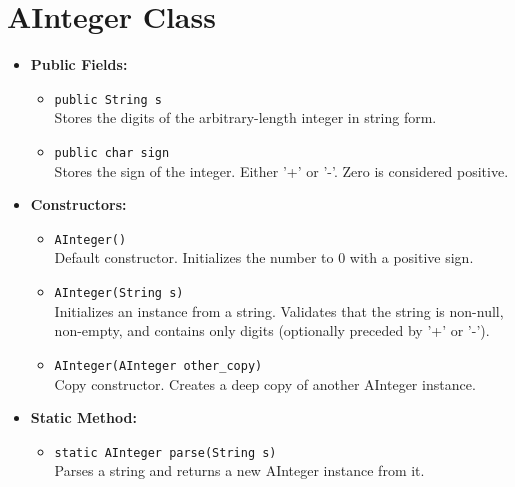 \documentclass{article}
\begin{document}
\section{AInteger Class}
\begin{itemize}
    \item \textbf{Public Fields:}
    \begin{itemize}
        \item \texttt{public String s} \\
        Stores the digits of the arbitrary-length integer in string form.

        \item \texttt{public char sign} \\
        Stores the sign of the integer. Either '+' or '-'. Zero is considered positive.
    \end{itemize}

    \item \textbf{Constructors:}
    \begin{itemize}
        \item \texttt{AInteger()} \\
        Default constructor. Initializes the number to 0 with a positive sign.

        \item \texttt{AInteger(String s)} \\
        Initializes an instance from a string. Validates that the string is non-null, non-empty, and contains only digits (optionally preceded by '+' or '-').

        \item \texttt{AInteger(AInteger other\_copy)} \\
        Copy constructor. Creates a deep copy of another AInteger instance.
    \end{itemize}

    \item \textbf{Static Method:}
    \begin{itemize}
        \item \texttt{static AInteger parse(String s)} \\
        Parses a string and returns a new AInteger instance from it.
    \end{itemize}
\end{itemize}
\end{document}
